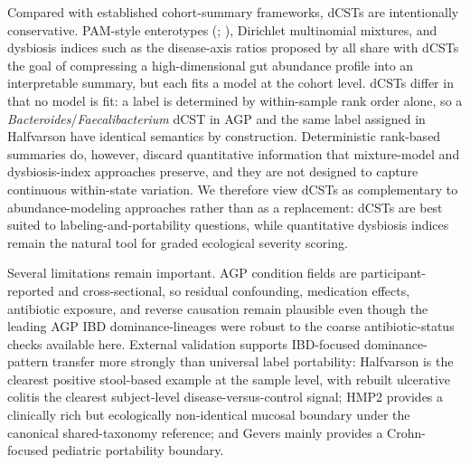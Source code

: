 \documentclass[
  11pt,
]{article}
\newcommand{\taxon}[1]{\emph{#1}}
\begin{document}
Compared with established cohort-summary frameworks, dCSTs are
intentionally conservative. PAM-style enterotypes
(;
), Dirichlet
multinomial mixtures, and dysbiosis indices such as the disease-axis
ratios proposed by 
all share with dCSTs the goal of compressing a high-dimensional gut
abundance profile into an interpretable summary, but each fits a model
at the cohort level. dCSTs differ in that no model is fit: a label is
determined by within-sample rank order alone, so a
\taxon{Bacteroides}/\taxon{Faecalibacterium} dCST in AGP and the same
label assigned in Halfvarson have identical semantics by construction.
Deterministic rank-based summaries do, however, discard quantitative
information that mixture-model and dysbiosis-index approaches preserve,
and they are not designed to capture continuous within-state variation.
We therefore view dCSTs as complementary to abundance-modeling
approaches rather than as a replacement: dCSTs are best suited to
labeling-and-portability questions, while quantitative dysbiosis indices
remain the natural tool for graded ecological severity scoring.

Several limitations remain important. AGP condition fields are
participant-reported and cross-sectional, so residual confounding,
medication effects, antibiotic exposure, and reverse causation remain
plausible even though the leading AGP IBD dominance-lineages were
robust to the coarse antibiotic-status checks available here. External
validation supports IBD-focused dominance-pattern transfer more
strongly than universal label portability: Halfvarson is the clearest
positive stool-based example at the sample level, with rebuilt
ulcerative colitis the clearest subject-level disease-versus-control
signal; HMP2 provides a clinically rich but ecologically non-identical
mucosal boundary under the canonical shared-taxonomy reference; and
Gevers mainly provides a Crohn-focused pediatric portability boundary.
\end{document}
